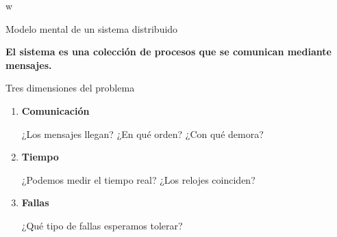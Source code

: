 w\documentclass[aspectratio=169]{beamer}
\begin{document}
\begin{frame}{Modelo mental de un sistema distribuido}

\begin{center}
\end{center}

\vspace{0.5cm}

\Large
\begin{center}
\textbf{El sistema es una colección de procesos que se comunican mediante mensajes.}
\end{center}

\end{frame}

\begin{frame}{Tres dimensiones del problema}

\Large

\begin{enumerate}
    \item \textbf{Comunicación}
    
    ¿Los mensajes llegan? ¿En qué orden? ¿Con qué demora?
    
    \vspace{0.4cm}
    
    \item \textbf{Tiempo}
    
    ¿Podemos medir el tiempo real? ¿Los relojes coinciden?
    
    \vspace{0.4cm}
    
    \item \textbf{Fallas}
    
    ¿Qué tipo de fallas esperamos tolerar?
\end{enumerate}

\end{frame}
\end{document}
